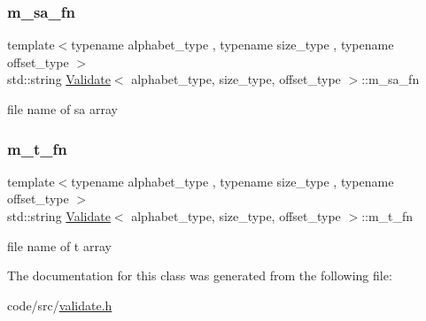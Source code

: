 \mbox{\label{class_validate_aa7c887cf55845b0214e8db3af1076283}} 
\subsubsection{\texorpdfstring{m\+\_\+sa\+\_\+fn}{m\_sa\_fn}}
{\footnotesize\ttfamily template$<$typename alphabet\+\_\+type , typename size\+\_\+type , typename offset\+\_\+type $>$ \\
std\+::string \hyperlink{class_validate}{Validate}$<$ alphabet\+\_\+type, size\+\_\+type, offset\+\_\+type $>$\+::m\+\_\+sa\+\_\+fn\hspace{0.3cm}{\ttfamily [private]}}



file name of sa array 

\mbox{\label{class_validate_a8038ca0a43b122fd9e08af72d7789611}} 
\subsubsection{\texorpdfstring{m\+\_\+t\+\_\+fn}{m\_t\_fn}}
{\footnotesize\ttfamily template$<$typename alphabet\+\_\+type , typename size\+\_\+type , typename offset\+\_\+type $>$ \\
std\+::string \hyperlink{class_validate}{Validate}$<$ alphabet\+\_\+type, size\+\_\+type, offset\+\_\+type $>$\+::m\+\_\+t\+\_\+fn\hspace{0.3cm}{\ttfamily [private]}}



file name of t array 



The documentation for this class was generated from the following file\+:\begin{DoxyCompactItemize}
\item 
code/src/\hyperlink{validate_8h}{validate.\+h}\end{DoxyCompactItemize}
